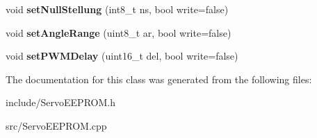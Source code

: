 \begin{DoxyCompactItemize}
void {\bfseries set\+Null\+Stellung} (int8\+\_\+t ns, bool write=false)
\item 
\mbox{\label{class_servo_e_e_p_r_o_m_af0e5887bd2a4c4fc599ad3e6553e40db}} 
void {\bfseries set\+Angle\+Range} (uint8\+\_\+t ar, bool write=false)
\item 
\mbox{\label{class_servo_e_e_p_r_o_m_a1d1649e95451baf3545ba476e33502b5}} 
void {\bfseries set\+P\+W\+M\+Delay} (uint16\+\_\+t del, bool write=false)
\end{DoxyCompactItemize}


The documentation for this class was generated from the following files\+:\begin{DoxyCompactItemize}
\item 
include/Servo\+E\+E\+P\+R\+O\+M.\+h\item 
src/Servo\+E\+E\+P\+R\+O\+M.\+cpp\end{DoxyCompactItemize}
